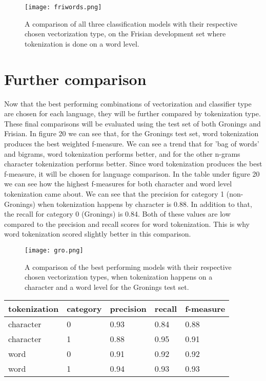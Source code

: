 \documentclass[
10pt, %
a4paper, %
oneside, %
headinclude,footinclude, %
] {book}%
\begin{document}
\begin{figure}[H]
  \texttt{[image: friwords.png]}
  \caption{A comparison of all three classification models with their respective chosen vectorization type, on the Frisian development set where tokenization is done on a word level.}
\end{figure} 

\section{Further comparison}
Now that the best performing combinations of vectorization and classifier type are chosen for each language, they will be further compared by tokenization type. These final comparisons will be evaluated using the test set of both Gronings and Frisian. In figure 20 we can see that, for the Gronings test set, word tokenization produces the best weighted f-measure. We can see a trend that for 'bag of words' and bigrams, word tokenization performs better, and for the other n-grams character tokenization performs better. Since word tokenization produces the best f-measure, it will be chosen for language comparison. In the table under figure 20 we can see how the highest f-measures for both character and word level tokenization came about. We can see that the precision for category 1 (non-Gronings) when tokenization happens by character is 0.88. In addition to that, the recall for category 0 (Gronings) is 0.84. Both of these values are low compared to the precision and recall scores for word tokenization. This is why word tokenization scored slightly better in this comparison.


\begin{figure}[H]
  \texttt{[image: gro.png]}
  \caption{A comparison of the best performing models with their respective chosen vectorization types, when tokenization happens on a character and a word level for the Gronings test set.}
\end{figure} 

\begin{table}[H]
\begin{tabular}{lllll}
tokenization & category & precision & recall & f-measure \\ \hline
character & 0 & 0.93      & 0.84   & 0.88   \\
character & 1 & 0.88      & 0.95   & 0.91      \\ \hline
word & 0 & 0.91      & 0.92   & 0.92      \\
word & 1 & 0.94      & 0.93   & 0.93    \\ \hline

\end{tabular}
\end{table}
\end{document}

